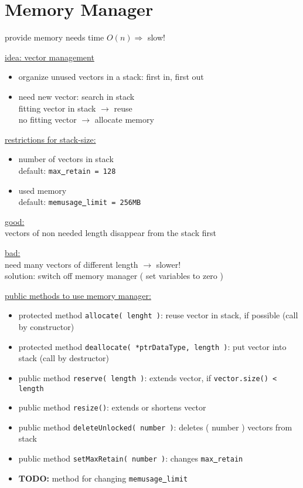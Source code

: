 \chapter{Memory Manager}

provide memory needs time $O(n)\Rightarrow$ slow!

\underline{ idea: vector management }
\vspace{-1ex}
\begin{itemize}
\item organize unused vectors in a stack: first in, first out
\item need new vector: search in stack \\ fitting vector in stack $\rightarrow$ reuse \\ no fitting vector $\rightarrow$ allocate memory
\end{itemize}

\underline{ restrictions for stack-size: }
\vspace{-1ex}
\begin{itemize}
\item number of vectors in stack\\ default: {\tt max\underline{ }retain = 128}
\item used memory\\ default: {\tt memusage\underline{ }limit = 256MB}
\end{itemize}


\underline{ good: } \\ vectors of non needed length disappear from the stack first

\underline{ bad: } \\ need many vectors of different length $\rightarrow$ slower! \\
solution: switch off memory manager ( set variables to zero )

\underline{ public methods to use memory manager: }
\begin{itemize}
\item protected method {\tt allocate( lenght )}: reuse vector in stack, if possible (call by constructor)
\item protected method {\tt deallocate( *ptrDataType, length )}: put vector into stack (call by destructor)
\item public method {\tt reserve( length )}: extends vector, if {\tt vector.size() < length}
\item public method {\tt resize()}: extends or shortens vector
\item public method {\tt deleteUnlocked( number )}: deletes ( number ) vectors from stack
\item public method {\tt setMaxRetain( number )}: changes {\tt max\underline{ }retain}
\item {\bf TODO: } method for changing {\tt memusage\underline{ }limit}
\end{itemize}


